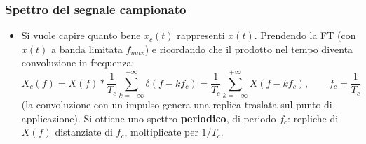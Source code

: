 \documentclass[12pt, a4paper]{article}
\begin{document}
\subsubsection{Spettro del segnale campionato}
\begin{itemize}
    \item Si vuole capire quanto bene $x_c(t)$ rappresenti $x(t)$. Prendendo la FT (con $x(t)$ a banda limitata $f_{max}$) e ricordando che il prodotto nel tempo diventa convoluzione in frequenza:
    $$X_c(f) = X(f) * \frac{1}{T_c}\sum_{k=-\infty}^{+\infty}\delta(f-kf_c) = \frac{1}{T_c}\sum_{k=-\infty}^{+\infty} X(f-kf_c), \qquad f_c=\frac{1}{T_c}$$
    (la convoluzione con un impulso genera una replica traslata sul punto di applicazione). Si ottiene uno spettro \textbf{periodico}, di periodo $f_c$: repliche di $X(f)$ distanziate di $f_c$, moltiplicate per $1/T_c$.
\end{itemize}
\end{document}
